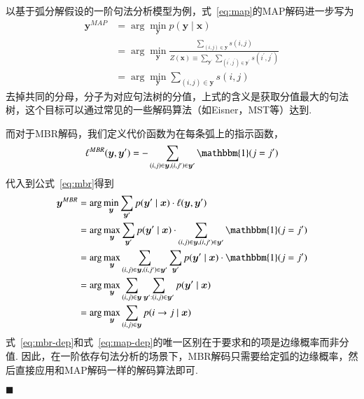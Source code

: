 以基于弧分解假设的一阶句法分析模型为例，式~\ref{eq:map}的MAP解码进一步写为
\begin{equation}
    \label{eq:map-dep}
    \begin{split}
        \boldsymbol{y}^{MAP}&=\arg\min_{\boldsymbol{y}}p(\boldsymbol{y}\mid\boldsymbol{x})\\
        &=\arg\min_{\boldsymbol{y}}\frac{\sum_{(i,j)\in \boldsymbol{y}}s(i,j)}{Z(\boldsymbol{x})\equiv \sum_{\boldsymbol{y}^{\prime}}\sum_{(i^{\prime},j^{\prime})\in \boldsymbol{y}^{\prime}}s(i^{\prime},j^{\prime})}\\
        &=\arg\min_{\boldsymbol{y}}\sum_{(i,j)\in \boldsymbol{y}}s(i,j)
    \end{split}
\end{equation}
去掉共同的分母，分子为对应句法树的分值，上式的含义是获取分值最大的句法树，这个目标可以通过常见的一些解码算法（如Eisner，MST等）达到.

而对于MBR解码，我们定义代价函数为在每条弧上的指示函数，
\begin{equation}
    \ell^{MBR}(\boldsymbol{y},\boldsymbol{y}^{\prime}) = -\sum_{(i,j)\in\boldsymbol{y},(i,j^{\prime})\in\boldsymbol{y}^{\prime}}\mathbbm{1}(j=j^{\prime})
\end{equation}
代入到公式~\ref{eq:mbr}得到
\begin{equation}
    \label{eq:mbr-dep}
    \begin{split}
        \boldsymbol{y}^{MBR}&= \arg\min_{\boldsymbol{y}}\sum_{\boldsymbol{y}^{\prime}}p(\boldsymbol{y}^{\prime}\mid\boldsymbol{x})\cdot\ell(\boldsymbol{y},\boldsymbol{y}^{\prime})\\
        &=\arg\max_{\boldsymbol{y}}\sum_{\boldsymbol{y}^{\prime}}p(\boldsymbol{y}^{\prime}\mid\boldsymbol{x})\cdot\sum_{(i,j)\in\boldsymbol{y},(i,j^{\prime})\in\boldsymbol{y}^{\prime}}\mathbbm{1}(j=j^{\prime})\\
        &=\arg\max_{\boldsymbol{y}}\sum_{(i,j)\in\boldsymbol{y},(i,j^{\prime})\in\boldsymbol{y}^{\prime}}\sum_{\boldsymbol{y}^{\prime}}p(\boldsymbol{y}^{\prime}\mid\boldsymbol{x})\cdot\mathbbm{1}(j=j^{\prime})\\
        &=\arg\max_{\boldsymbol{y}}\sum_{(i,j)\in\boldsymbol{y}}\sum_{\boldsymbol{y}^{\prime}:(i,j)\in \boldsymbol{y}^{\prime}}p(\boldsymbol{y}^{\prime}\mid\boldsymbol{x})\\
        &=\arg\max_{\boldsymbol{y}}\sum_{(i,j)\in\boldsymbol{y}}p(i\rightarrow j\mid\boldsymbol{x})
    \end{split}
\end{equation}
式~\ref{eq:mbr-dep}和式~\ref{eq:map-dep}的唯一区别在于要求和的项是边缘概率而非分值.
因此，在一阶依存句法分析的场景下，MBR解码只需要给定弧的边缘概率，然后直接应用和MAP解码一样的解码算法即可\cite{smith-smith-2007-probabilistic, smith-2011-linguistic}.

\noindent$\blacksquare$

